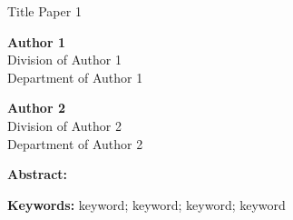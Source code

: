 
\begin{center}
	{Title Paper 1}\\
	
	\vspace{0.20cm}
	
	\textbf{Author 1}\\
	Division of Author 1\\
	Department of Author 1\\
	
	\vspace{0.12cm}
	
	\textbf{Author 2}\\
	Division of Author 2\\
	Department of Author 2\\
	
	\vspace{0.12cm}
\end{center}

\textbf{Abstract: }\lipsum[1]

\textbf{Keywords: }keyword; keyword; keyword; keyword
